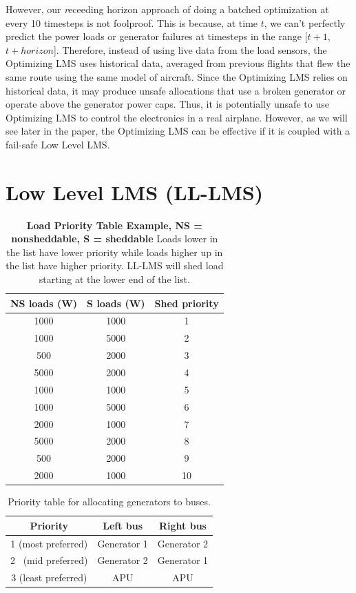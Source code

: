 \documentclass{acm_proc_article-sp}
\begin{document}
However, our {\emph receeding horizon} approach of doing a batched optimization at every 10 timesteps is not foolproof.
This is because, at time $t$, we can't perfectly predict the power loads or generator failures at timesteps in the range [$t+1$, $t+horizon$]. 
Therefore, instead of using live data from the load sensors, the Optimizing LMS uses historical data, averaged from previous flights that flew the same route using the same model of aircraft.
Since the Optimizing LMS relies on historical data, it may produce unsafe allocations that use a broken generator or operate above the generator power caps.
Thus, it is potentially unsafe to use Optimizing LMS to control the electronics in a real airplane. 
However, as we will see later in the paper, the Optimizing LMS can be effective if it is coupled with a fail-safe Low Level LMS.

\section{Low Level LMS (LL-LMS)}
\label{sec:LL-LMS}
\begin{table}[t]
\caption{\textbf{Load Priority Table Example, NS = nonsheddable, S = sheddable} 
Loads lower in the list have lower priority while loads higher up in the list have
higher priority. LL-LMS will shed load starting at the lower end of the list.}
\label{T:shed}
\centering
\begin{tabular}{c|cc}
 NS loads (W) & S loads (W) & Shed priority \\ \hline
1000 & 1000 & 1 \\
1000 & 5000 & 2 \\
500 & 2000 & 3 \\
5000 & 2000 & 4 \\
1000 & 1000 & 5 \\
1000 & 5000 & 6 \\
2000 & 1000 & 7 \\
5000 & 2000 & 8 \\
500 & 2000 & 9 \\
2000 & 1000 & 10 \\ \hline
\end{tabular}
\end{table}

\begin{table}[t]
\caption{Priority table for allocating generators to buses.}
\label{T:generator-priority}
\centering
\begin{tabular}{c|cc}
 Priority & Left bus & Right bus \\ \hline
1 (most preferred) & Generator 1 & Generator 2 \\
2 ~(mid preferred) & Generator 2 & Generator 1 \\
3 (least preferred) & APU & APU \\ \hline
\end{tabular}
\end{table}
\end{document}
